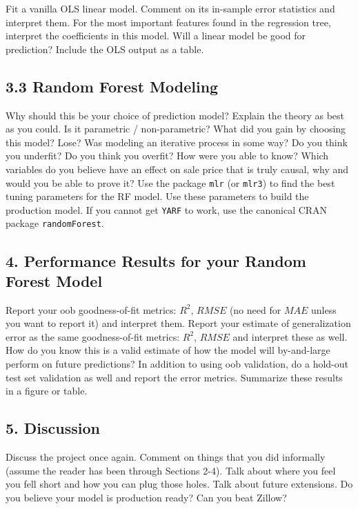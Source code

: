 \documentclass[12pt]{article}
\begin{document}
\begin{tcolorbox}
Fit a vanilla OLS linear model. Comment on its in-sample error statistics and interpret them. For the most important features found in the regression tree, interpret the coefficients in this model. Will a linear model be good for prediction? Include the OLS output as a table.

\subsection*{3.3 Random Forest Modeling}

Why should this be your choice of prediction model? Explain the theory as best as you could. Is it parametric / non-parametric? What did you gain by choosing this model? Lose? Was modeling an iterative process in some way? Do you think you underfit? Do you think you overfit? How were you able to know? Which variables do you believe have an effect on sale price that is truly causal, why and would you be able to prove it? Use the package \texttt{mlr} (or \texttt{mlr3}) to find the best tuning parameters for the RF model. Use these parameters to build the production model. If you cannot get \texttt{YARF} to work, use the canonical CRAN package \texttt{randomForest}.

\subsection*{4. Performance Results for your Random Forest Model}

Report your oob goodness-of-fit metrics: $R^2$, $RMSE$ (no need for $MAE$ unless you want to report it) and interpret them. Report your estimate of generalization error as the same goodness-of-fit metrics: $R^2$, $RMSE$ and interpret these as well. How do you know this is a valid estimate of how the model will by-and-large perform on future predictions? In addition to using oob validation, do a hold-out test set validation as well and report the error metrics. Summarize these results in a figure or table.

\subsection*{5. Discussion}

Discuss the project once again. Comment on things that you did informally (assume the reader has been through Sections 2-4). Talk about where you feel you fell short and how you can plug those holes. Talk about future extensions. Do you believe your model is production ready? Can you beat Zillow?



\end{tcolorbox}
\end{document}
